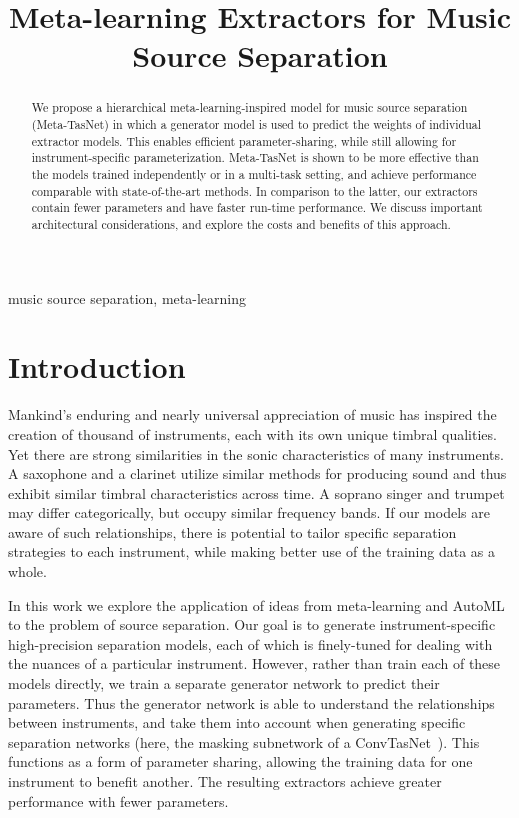 \documentclass{article}
\title{Meta-learning Extractors for Music Source Separation}
\begin{document}
\maketitle

\begin{abstract}
We propose a hierarchical meta-learning-inspired model for music source separation (Meta-TasNet) in which a generator model is used to predict the weights of individual extractor models. This enables efficient parameter-sharing, while still allowing for instrument-specific parameterization.  Meta-TasNet is shown to be more effective than the models trained independently or in a multi-task setting, and achieve performance comparable with state-of-the-art methods.  In comparison to the latter, our extractors contain fewer parameters and have faster run-time performance. We discuss important architectural considerations, and explore the costs and benefits of this approach.
\end{abstract}

\begin{keywords}
music source separation, meta-learning
\end{keywords}
 \section{Introduction}
\label{sec:intro}

Mankind's enduring and nearly universal appreciation of music has inspired the creation of thousand of instruments, each with its own unique timbral qualities.  Yet there are strong similarities in the sonic characteristics of many instruments.  A saxophone and a clarinet utilize similar methods for producing sound and thus exhibit similar timbral characteristics across time.  A soprano singer and trumpet may differ categorically, but occupy similar frequency bands.  If our models are aware of such relationships, there is potential to tailor specific separation strategies to each instrument, while making better use of the training data as a whole.

In this work we explore the application of ideas from meta-learning and AutoML to the problem of source separation.  Our goal is to generate instrument-specific high-precision separation models, each of which is finely-tuned for dealing with the nuances of a particular instrument.  However, rather than train each of these models directly, we train a separate generator network to predict their parameters.  Thus the generator network is able to understand the relationships between instruments, and take them into account when generating specific separation networks (here, the masking subnetwork of a ConvTasNet~\cite{conv-tasnet}).  This functions as a form of parameter sharing, allowing the training data for one instrument to benefit another.  The resulting extractors achieve greater performance with fewer parameters.
\end{document}
